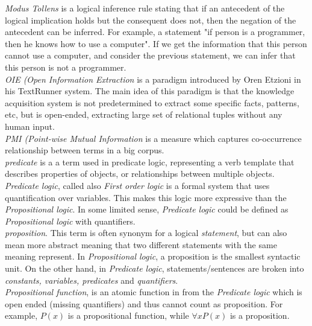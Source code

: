 \emph{Modus Tollens} is a logical inference rule stating that if an antecedent
of the logical implication holds but the consequent does not, then the negation
of the antecedent can be inferred. For example, a statement "if person is a 
programmer, then he knows how to use a computer". If we get the information
that this person cannot use a computer, and consider the previous statement, we
can infer that this person is not a programmer. \\

\emph{OIE (Open Information Extraction} is a paradigm introduced by Oren Etzioni
in his TextRunner system. The main idea of this paradigm is that the knowledge 
acquisition system is not predetermined to extract some specific facts, 
patterns, etc, but is open-ended, extracting large set of relational tuples 
without any human input.\\

\emph{PMI (Point-wise Mutual Information} is a measure which captures 
co-occurrence relationship between terms in a big corpus.\\

\emph{predicate} is a a term used in predicate logic, representing a verb
template that describes properties of objects, or relationships between multiple
objects.\\

\emph{Predicate logic}, called also \emph{First order logic} is a formal system
that uses quantification over variables. This makes this logic more expressive
than the \emph{Propositional logic}. In some limited sense, 
\emph{Predicate logic} could be defined as \emph{Propositional logic} with 
quantifiers.\\

\emph{proposition}. This term is often synonym for a logical \emph{statement},
but can also mean more abstract meaning that two different statements with the
same meaning represent. In \emph{Propositional logic}, a proposition is the
smallest syntactic unit. On the other hand, in \emph{Predicate logic}, 
statements/sentences are broken into \emph{constants, variables, predicates}
and \emph{quantifiers}.\\

\emph{Propositional function}, is an atomic function in from the 
\emph{Predicate logic} which is open ended (missing quantifiers) and thus
cannot count as proposition. For example, $P(x)$ is a propositional function,
while $\forall x P(x)$ is a proposition.\\

